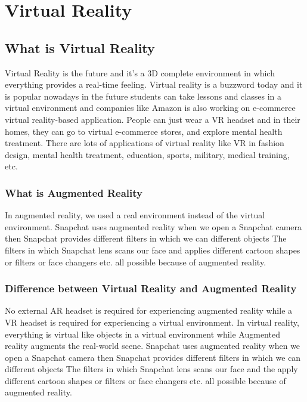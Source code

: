 
\chapter{Virtual Reality}
\label{AppendixA}


\section{What is Virtual Reality}%

Virtual Reality is the future and it's a 3D complete environment in which everything provides a real-time feeling. Virtual reality is a buzzword today and it is popular nowadays in the future students can take lessons and classes in a virtual environment and companies like Amazon is also working on e-commerce virtual reality-based application. People can just wear a VR headset and in their homes, they can go to virtual e-commerce stores, and explore mental health treatment. There are lots of applications of virtual reality like VR in fashion design, mental health treatment, education, sports, military, medical training, etc.

\subsection{What is Augmented Reality}
In augmented reality, we used a real environment instead of the virtual environment. Snapchat uses augmented reality when we open a Snapchat camera then Snapchat provides different filters in which we can different objects The filters in which Snapchat lens scans our face and applies different cartoon shapes or filters or face changers etc. all possible because of augmented reality.

\subsection{Difference between Virtual Reality and Augmented Reality}
No external AR headset is required for experiencing augmented reality while a VR headset is required for experiencing a virtual environment. In virtual reality, everything is virtual like objects in a virtual environment while Augmented reality augments the real-world scene. Snapchat uses augmented reality when we open a Snapchat camera then Snapchat provides different filters in which we can different objects The filters in which Snapchat lens scans our face and the apply different cartoon shapes or filters or face changers etc. all possible because of augmented reality.